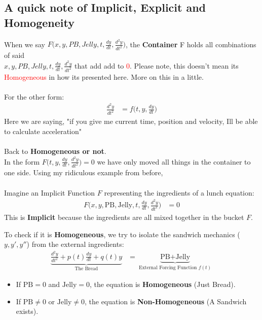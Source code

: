 \documentclass[11pt]{article}
\begin{document}
\subsection*{A quick note of Implicit, Explicit and Homogeneity}
When we say $F\Bigg(x,y,PB,Jelly,t,\frac{dy}{dt},\frac{d^2y}{dt^2}\Bigg)$, the \textbf{Container} F holds all combinations of said \\
$x,y,PB,Jelly,t,\frac{dy}{dt},\frac{d^2y}{dt^2}$ that add add to \textcolor{red}{0}.
Please note, this doesn't mean its \textcolor{red}{Homogeneous} in how its presented here. More on this in a little.\\
\\
For the other form:
\begin{align*}
    \frac{d^2y}{dt^2}&= f\Bigg(t,y,\frac{dy}{dt}\Bigg)
\end{align*}
Here we are saying, "if you give me current time, position and velocity, Ill be able to calculate acceleration"
\\
\\
Back to \textbf{Homogeneous or not}.\\
In the form $F\Bigg(t,y,\frac{dy}{dt},\frac{d^2y}{dt^2}\Bigg)=0$ we have only moved all things in the container to one side. Using my ridiculous example from before,\\
\\
Imagine an Implicit Function $F$ representing the ingredients of a lunch equation:
\begin{align*}
    F\Bigg(x, y, \text{PB}, \text{Jelly}, t, \frac{dy}{dt}, \frac{d^2y}{dt^2}\Bigg) &= 0
\end{align*}
This is \textbf{Implicit} because the ingredients are all mixed together in the bucket $F$.

To check if it is \textbf{Homogeneous}, we try to isolate the sandwich mechanics ($y, y', y''$) from the external ingredients:
\begin{align*}
    \underbrace{\frac{d^2y}{dt^2} + p(t)\frac{dy}{dt} + q(t)y}_{\text{The Bread}} &= \underbrace{\text{PB} + \text{Jelly}}_{\text{External Forcing Function } f(t)}
\end{align*}
\begin{itemize}
    \item If $\text{PB} = 0$ and $\text{Jelly} = 0$, the equation is \textbf{Homogeneous} (Just Bread).
    \item If $\text{PB} \neq 0$ or $\text{Jelly} \neq 0$, the equation is \textbf{Non-Homogeneous} (A Sandwich exists).
\end{itemize}
\end{document}
